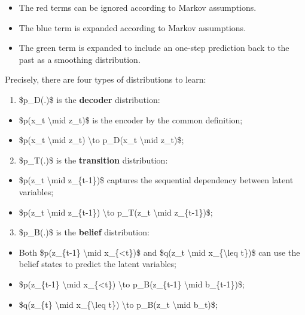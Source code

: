 \begin{itemize}
\tightlist
\item
  The {red} terms can be ignored according to Markov assumptions.
\item
  The {blue} term is expanded according to Markov assumptions.
\item
  The {green} term is expanded to include an one-step prediction back to the past as a smoothing distribution.
\end{itemize}

Precisely, there are four types of distributions to learn:

\begin{enumerate}
\tightlist
\item
  \$p\_D(.)\$ is the \textbf{decoder} distribution:
\end{enumerate}

\begin{itemize}
\tightlist
\item
  \$p(x\_t \textbackslash mid z\_t)\$ is the encoder by the common definition;
\item
  \$p(x\_t \textbackslash mid z\_t) \textbackslash to p\_D(x\_t \textbackslash mid z\_t)\$;
\end{itemize}

\begin{enumerate}
\setcounter{enumi}{1}
\tightlist
\item
  \$p\_T(.)\$ is the \textbf{transition} distribution:
\end{enumerate}

\begin{itemize}
\tightlist
\item
  \$p(z\_t \textbackslash mid z\_\{t-1\})\$ captures the sequential dependency between latent variables;
\item
  \$p(z\_t \textbackslash mid z\_\{t-1\}) \textbackslash to p\_T(z\_t \textbackslash mid z\_\{t-1\})\$;
\end{itemize}

\begin{enumerate}
\setcounter{enumi}{2}
\tightlist
\item
  \$p\_B(.)\$ is the \textbf{belief} distribution:
\end{enumerate}

\begin{itemize}
\tightlist
\item
  Both \$p(z\_\{t-1\} \textbackslash mid x\_\{\textless t\})\$ and \$q(z\_t \textbackslash mid x\_\{\textbackslash leq t\})\$ can use the belief states to predict the latent variables;
\item
  \$p(z\_\{t-1\} \textbackslash mid x\_\{\textless t\}) \textbackslash to p\_B(z\_\{t-1\} \textbackslash mid b\_\{t-1\})\$;
\item
  \$q(z\_\{t\} \textbackslash mid x\_\{\textbackslash leq t\}) \textbackslash to p\_B(z\_t \textbackslash mid b\_t)\$;
\end{itemize}

